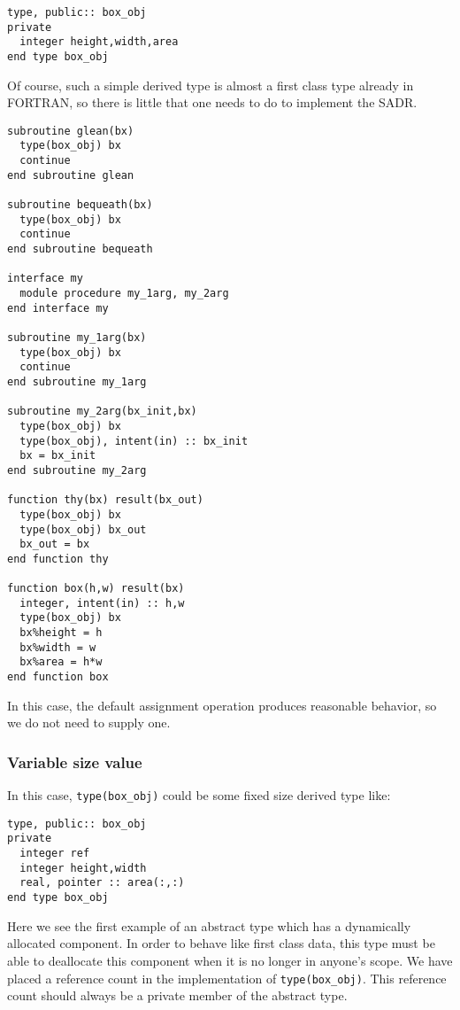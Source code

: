 \begin{verbatim}
type, public:: box_obj
private
  integer height,width,area
end type box_obj
\end{verbatim}

Of course, such a simple derived type is almost a first class
type already in FORTRAN, so there is little that one needs to
do to implement the SADR.

\begin{verbatim}
subroutine glean(bx)
  type(box_obj) bx
  continue
end subroutine glean

subroutine bequeath(bx)
  type(box_obj) bx
  continue
end subroutine bequeath

interface my
  module procedure my_1arg, my_2arg
end interface my

subroutine my_1arg(bx)
  type(box_obj) bx
  continue
end subroutine my_1arg

subroutine my_2arg(bx_init,bx)
  type(box_obj) bx
  type(box_obj), intent(in) :: bx_init
  bx = bx_init
end subroutine my_2arg

function thy(bx) result(bx_out)
  type(box_obj) bx
  type(box_obj) bx_out
  bx_out = bx
end function thy

function box(h,w) result(bx)
  integer, intent(in) :: h,w
  type(box_obj) bx
  bx%height = h
  bx%width = w
  bx%area = h*w
end function box

\end{verbatim}

In this case, the default assignment operation produces reasonable
behavior, so we do not need to supply one.

\subsubsection{Variable size value}

In this case, \verb+type(box_obj)+ could be some fixed size derived type
like:

\begin{verbatim}
type, public:: box_obj
private
  integer ref
  integer height,width
  real, pointer :: area(:,:)
end type box_obj
\end{verbatim}

Here we see the first example of an abstract type which has a
dynamically allocated component.  In order to behave like first class
data, this type must be able to deallocate this component when it is
no longer in anyone's scope.  We have placed a reference count in the
implementation of \verb+type(box_obj)+.  This reference count should
always be a private member of the abstract type.

